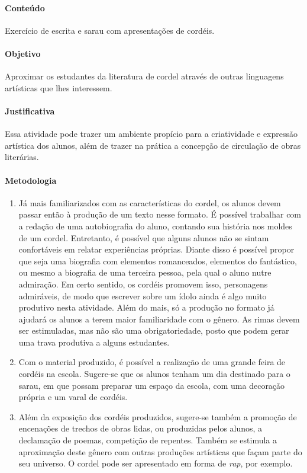 \documentclass[12pt]{extarticle}
\begin{document}
\paragraph{Conteúdo} Exercício de escrita e sarau com apresentações de cordéis.

\paragraph{Objetivo} Aproximar os estudantes da literatura de cordel através de outras linguagens artísticas que lhes interessem.

\paragraph{Justificativa} Essa atividade pode trazer um ambiente propício para a criatividade e expressão artística dos alunos, além de trazer na prática a concepção de circulação de obras literárias.

\paragraph{Metodologia}

\begin{enumerate}

\item Já mais familiarizados com as características do cordel, os
alunos devem passar então à produção de um texto nesse formato. É
possível trabalhar com a redação de uma autobiografia do aluno, contando
sua história nos moldes de um cordel. Entretanto, é possível que alguns
alunos não se sintam confortáveis em relatar experiências próprias.
Diante disso é possível propor que seja uma biografia com elementos
romanceados, elementos do fantástico, ou mesmo a biografia de uma
terceira pessoa, pela qual o aluno nutre admiração. Em certo sentido, os
cordéis promovem isso, personagens admiráveis, de modo que escrever
sobre um ídolo ainda é algo muito produtivo nesta atividade. Além do
mais, só a produção no formato já ajudará os alunos a terem maior
familiaridade com o gênero. As rimas devem ser estimuladas, mas não são
uma obrigatoriedade, posto que podem gerar uma trava produtiva a alguns
estudantes.

\item Com o material produzido, é possível a
realização de uma grande feira de cordéis na escola.
Sugere-se que os alunos tenham um dia destinado para o sarau, em que possam preparar
um espaço da escola, com uma decoração própria e um varal de cordéis.

\item Além da exposição dos cordéis produzidos, sugere-se também a
promoção de encenações de trechos de obras lidas, ou produzidas pelos
alunos, a declamação de poemas, competição de repentes. Também se
estimula a aproximação deste gênero com outras produções artísticas
que façam parte do seu universo. O cordel pode ser apresentado em forma de \emph{rap}, por exemplo.


\end{enumerate}
\end{document}
